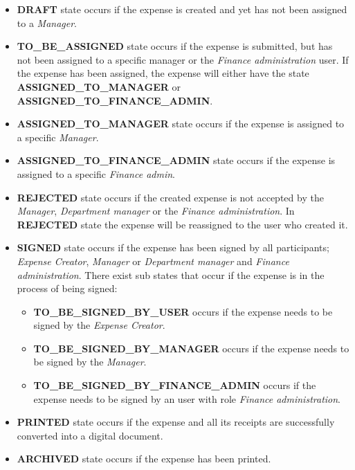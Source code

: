 \begin{itemize}
    \item \textbf{DRAFT} state occurs if the expense is created and yet has not been assigned to a \textit{Manager}.

    \item \textbf{TO\_BE\_ASSIGNED} state occurs if the expense is submitted, but has not been assigned to a specific manager or the \textit{Finance administration} user. If the expense has been assigned, the expense will either have the state \newline \textbf{ASSIGNED\_TO\_MANAGER} or \newline \textbf{ASSIGNED\_TO\_FINANCE\_ADMIN}.

    \item \textbf{ASSIGNED\_TO\_MANAGER} state occurs if the expense is assigned to a specific \textit{Manager}.

    \item \textbf{ASSIGNED\_TO\_FINANCE\_ADMIN} state occurs if the expense is assigned to a specific \textit{Finance admin}.

    \item \textbf{REJECTED} state occurs if the created expense is not accepted by the \textit{Manager}, \textit{Department manager} or the \textit{Finance administration}. In \textbf{REJECTED} state the expense will be reassigned to the user who created it.

    \item \textbf{SIGNED} state occurs if the expense has been signed by all participants; \textit{Expense Creator}, \textit{Manager} or \textit{Department manager} and \textit{Finance administration}. There exist sub states that occur if the expense is in the process of being signed:
        \begin{itemize}
            \item \textbf{TO\_BE\_SIGNED\_BY\_USER} occurs if the expense needs to be signed by the \textit{Expense Creator}.
            \item \textbf{TO\_BE\_SIGNED\_BY\_MANAGER} occurs if the expense needs to be \newline signed by the \textit{Manager}.
            \item \textbf{TO\_BE\_SIGNED\_BY\_FINANCE\_ADMIN} occurs if the expense \newline needs to be signed by an user with role \textit{Finance administration}.
        \end{itemize}

    \item \textbf{PRINTED} state occurs if the expense and all its receipts are successfully converted into a digital document.

    \item \textbf{ARCHIVED} state occurs if the expense has been printed.
\end{itemize}

